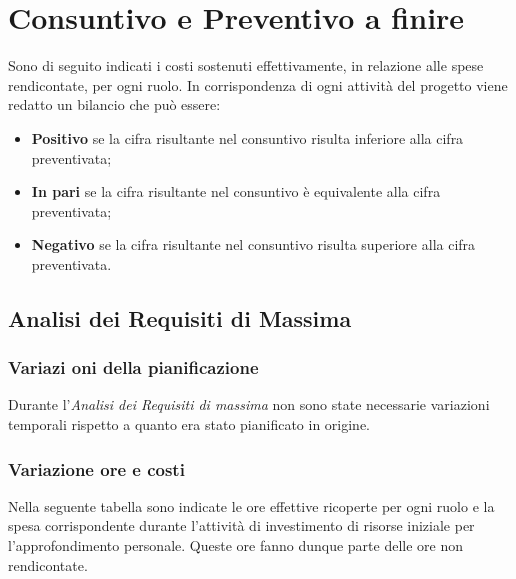 \section{Consuntivo e Preventivo a finire}
Sono di seguito indicati i costi sostenuti effettivamente, in relazione alle spese rendicontate, per ogni ruolo.
In corrispondenza di ogni attività del progetto viene redatto un bilancio che può essere:
\begin{itemize}
	\item \textbf{Positivo} se la cifra risultante nel consuntivo risulta inferiore alla cifra preventivata;
	\item \textbf{In pari} se la cifra risultante nel consuntivo è equivalente alla cifra preventivata;	
	\item \textbf{Negativo} se la cifra risultante nel consuntivo risulta superiore alla cifra preventivata.
\end{itemize}
	\subsection{Analisi dei Requisiti di Massima}
		\subsubsection{Variazi
			oni della pianificazione}
		Durante l'\textit{Analisi dei Requisiti di massima} non sono state necessarie variazioni temporali rispetto a quanto era stato pianificato in origine.
		\subsubsection{Variazione ore e costi}
		Nella seguente tabella sono indicate le ore effettive ricoperte per ogni ruolo e la spesa corrispondente durante l'attività di investimento di risorse iniziale per l'approfondimento personale. Queste ore fanno dunque parte delle ore non rendicontate.
		
